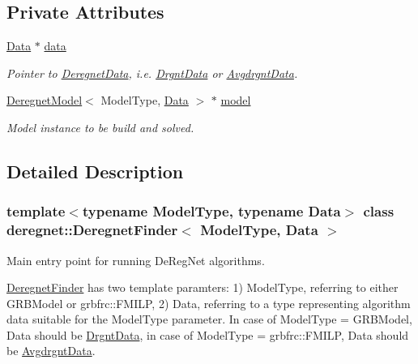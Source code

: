 \subsection*{Private Attributes}
\begin{DoxyCompactItemize}
\item 
\hyperlink{avgdrgnt_8cpp_a1d1235306db276e9b36acba1db1509e8}{Data} $\ast$ \hyperlink{classderegnet_1_1DeregnetFinder_ab158f2a6bb7f39ed3d6e4a9ffe568232}{data}
\begin{DoxyCompactList}\small\item\em Pointer to \hyperlink{classderegnet_1_1DeregnetData}{Deregnet\+Data}, i.\+e. \hyperlink{classderegnet_1_1DrgntData}{Drgnt\+Data} or \hyperlink{classderegnet_1_1AvgdrgntData}{Avgdrgnt\+Data}. \end{DoxyCompactList}\item 
\hyperlink{classderegnet_1_1DeregnetModel}{Deregnet\+Model}$<$ Model\+Type, \hyperlink{avgdrgnt_8cpp_a1d1235306db276e9b36acba1db1509e8}{Data} $>$ $\ast$ \hyperlink{classderegnet_1_1DeregnetFinder_ad922d8e38124b4c75daac29a928fcf5b}{model}
\begin{DoxyCompactList}\small\item\em Model instance to be build and solved. \end{DoxyCompactList}\end{DoxyCompactItemize}


\subsection{Detailed Description}
\subsubsection*{template$<$typename Model\+Type, typename Data$>$\newline
class deregnet\+::\+Deregnet\+Finder$<$ Model\+Type, Data $>$}

Main entry point for running De\+Reg\+Net algorithms. 

\hyperlink{classderegnet_1_1DeregnetFinder}{Deregnet\+Finder} has two template paramters\+: 1) Model\+Type, referring to either G\+R\+B\+Model or grbfrc\+::\+F\+M\+I\+LP, 2) Data, referring to a type representing algorithm data suitable for the Model\+Type parameter. In case of Model\+Type = G\+R\+B\+Model, Data should be \hyperlink{classderegnet_1_1DrgntData}{Drgnt\+Data}, in case of Model\+Type = grbfrc\+::\+F\+M\+I\+LP, Data should be \hyperlink{classderegnet_1_1AvgdrgntData}{Avgdrgnt\+Data}.


